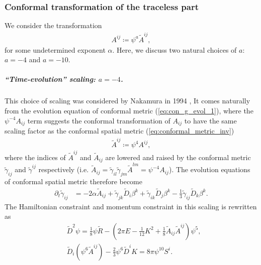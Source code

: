 \subsubsection{Conformal transformation of the traceless part}
We consider the transformation
\begin{align}
    A^{ij} \coloneqq \psi^a \tilde{A}^{ij},
\end{align}
for some undetermined exponent $\alpha$.
Here, we discuss two natural choices of $a$: $a = -4$ and $a = -10$.

\subparagraph{“Time-evolution” scaling: $a=-4$.}
This choice of scaling was considered by Nakamura in 1994 \cite{nakamura19943d},
It comes naturally from the evolution equation of conformal metric (\ref{eq:con_g_evol_1}),
where the $\psi^{-4}A_{ij}$ term suggests the conformal transformation of $A_{ij}$ to have the same scaling factor as the conformal spatial metric (\ref{eq:conformal_metric_inv})
\begin{align}
    \tilde{A}^{ij} \coloneqq \psi^4 A^{ij},
\end{align}
where the indices of $\tilde{A}^{ij}$ and $\tilde{A}_{ij}$ are lowered and raised by the conformal metric $\tilde{\gamma}_{ij}$ and $\tilde{\gamma}^{ij}$ respectively
(i.e. $\tilde{A}_{ij} = \tilde{\gamma}_{il}\tilde{\gamma}_{jm}\tilde{A}^{lm} = \psi^{-4} A_{ij}$).
The evolution equations of conformal spatial metric therefore become
\begin{align}
    \partial_t \tilde{\gamma}_{ij} &= - 2\alpha \tilde{A}_{ij} + \tilde{\gamma}_{jk} \tilde{D}_i \beta^k + \tilde{\gamma}_{ik} \tilde{D}_j \beta^k - \frac{1}{3} \tilde{\gamma}_{ij} \tilde{D}_k \beta^k.
\end{align}
The Hamiltonian constraint and momentum constraint in this scaling is rewritten as
\begin{align}
    &\tilde{D}^2 \psi = \frac{1}{8} \psi \tilde{R} - \left( 2 \pi E - \frac{1}{12}K^2 + \frac{1}{8} \tilde{A}_{ij} \tilde{A}^{ij} \right) \psi^5, 
    \label{eq:H_const_s4}\\
    &\tilde{D}_i \left(\psi^6 \tilde{A}^{ij} \right) - \frac{2}{3}\psi^6 \tilde{D}^i K = 8\pi \psi^{10} S^i.\label{eq:S_const_s4}
\end{align}


